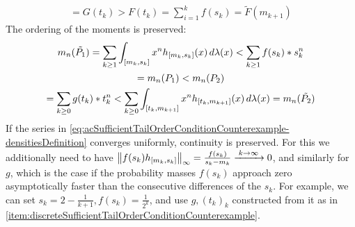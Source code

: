 \documentclass[a4paper]{scrreprt}
\begin{document}
\begin{ex}
\begin{enumerate}
\begin{gather*}
                = G(t_k)
                > F(t_k)
                = \sum_{i=1}^{k} f(s_k) 
                = \tilde{F}(m_{k+1})
            \end{gather*}
            The ordering of the moments is preserved:
            \begin{multline*}
                m_n(\tilde{P_1})
                = \sum_{k \geq 1} \int_{[m_k, s_k]} x^n h_{[m_k, s_k]}(x) \, d\lambda(x)
                < \sum_{k \geq 1} f(s_k)*s_k^n \\
                = m_n(P_1)
                < m_n(P_2) \\
                = \sum_{k \geq 0} g(t_k)*t_k^n
                < \sum_{k \geq 0} \int_{[t_k, m_{k+1}]} x^n h_{[t_k, m_{k+1}]}(x) \, d\lambda(x)
                = m_n(\tilde{P_2})
            \end{multline*}
            If the series in \eqref{eq:acSufficientTailOrderConditionCounterexample-densitiesDefinition} converges uniformly, continuity is preserved.
            For this we additionally need to have $\left\lVert f(s_k) h_{[m_k, s_k]}\right\rVert_\infty = \frac{f(s_k)}{s_k - m_k} \xrightarrow{\;k \to \infty\;} 0$, and similarly for $g$, which is the case if the probability masses $f(s_k)$ approach zero asymptotically faster than the consecutive differences of the $s_k$. For example, we can set $s_k = 2-\frac{1}{k+1}, f(s_k) = \frac{1}{2^k}$, and use $g, (t_k)_k$ constructed from it as in \ref{item:discreteSufficientTailOrderConditionCounterexample}.
        \end{enumerate}
    \end{ex}
    
\end{document}

